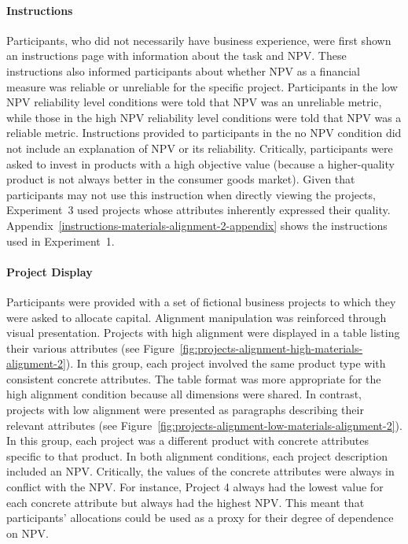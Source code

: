 \documentclass[a4paper, nobind]{templates/ociamthesis}
\theoremstyle{definition}
\theoremstyle{definition}
\theoremstyle{definition}
\theoremstyle{definition}
\theoremstyle{remark}
\begin{document}
\hypertarget{instructions-materials-alignment-2}{%
\paragraph{Instructions}\label{instructions-materials-alignment-2}}

Participants, who did not necessarily have business experience, were first shown
an instructions page with information about the task and NPV. These instructions
also informed participants about whether NPV as a financial measure was reliable
or unreliable for the specific project. Participants in the low NPV reliability
level conditions were told that NPV was an unreliable metric, while those in the
high NPV reliability level conditions were told that NPV was a reliable metric.
Instructions provided to participants in the no NPV condition did not include an
explanation of NPV or its reliability. Critically, participants were asked to
invest in products with a high objective value (because a higher-quality product
is not always better in the consumer goods market). Given that participants may
not use this instruction when directly viewing the projects, Experiment~3 used
projects whose attributes inherently expressed their quality.
Appendix~\ref{instructions-materials-alignment-2-appendix} shows the
instructions used in Experiment~1.

\hypertarget{projects-materials-alignment-2}{%
\paragraph{Project Display}\label{projects-materials-alignment-2}}

Participants were provided with a set of fictional business projects to which
they were asked to allocate capital. Alignment manipulation was reinforced
through visual presentation. Projects with high alignment were displayed in a
table listing their various attributes (see
Figure~\ref{fig:projects-alignment-high-materials-alignment-2}). In this group,
each project involved the same product type with consistent concrete attributes.
The table format was more appropriate for the high alignment condition because
all dimensions were shared. In contrast, projects with low alignment were
presented as paragraphs describing their relevant attributes (see
Figure~\ref{fig:projects-alignment-low-materials-alignment-2}). In this group,
each project was a different product with concrete attributes specific to that
product. In both alignment conditions, each project description included an NPV.
Critically, the values of the concrete attributes were always in conflict with
the NPV. For instance, Project 4 always had the lowest value for each concrete
attribute but always had the highest NPV. This meant that participants'
allocations could be used as a proxy for their degree of dependence on NPV.
\end{document}
